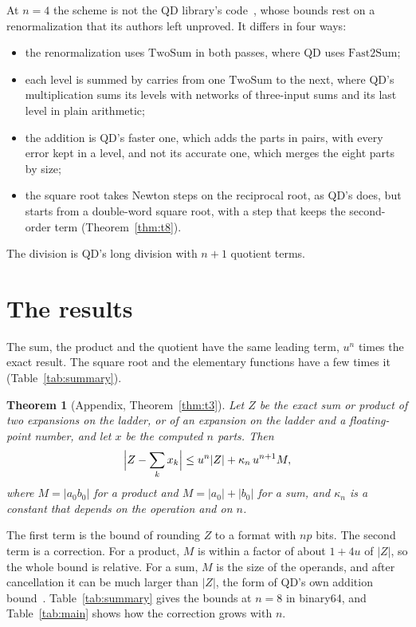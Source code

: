 \documentclass[conference]{IEEEtran}
\newtheorem{theorem}{Theorem}
\theoremstyle{definition}
\theoremstyle{remark}
\newcommand{\TwoSum}{\mathrm{TwoSum}}
\newcommand{\FastTwoSum}{\mathrm{Fast2Sum}}
\begin{document}
\begin{samepage}
At $n = 4$ the scheme is not the QD library's code~\cite{HLB01}, whose bounds rest on a renormalization that its
authors left unproved. It differs in four ways:
\begin{itemize}
\item the renormalization uses $\TwoSum$ in both passes, where QD uses $\FastTwoSum$;
\item each level is summed by carries from one $\TwoSum$ to the next, where QD's multiplication sums its levels
  with networks of three-input sums and its last level in plain arithmetic;
\item the addition is QD's faster one, which adds the parts in pairs, with every error kept in a level, and not its
  accurate one, which merges the eight parts by size;
\item the square root takes Newton steps on the reciprocal root, as QD's does, but starts from a double-word square
  root, with a step that keeps the second-order term (Theorem~\ref{thm:t8}).
\end{itemize}
\end{samepage}
The division is QD's long division with $n + 1$ quotient terms.

\section{The results}

The sum, the product and the quotient have the same leading term, $u^n$ times the exact result. The square root and
the elementary functions have a few times it (Table~\ref{tab:summary}).

\begin{theorem}[Appendix, Theorem~\ref{thm:t3}]\label{thm:main}
Let $Z$ be the exact sum or product of two expansions on the ladder, or of an expansion on the ladder and a
floating-point number, and let $x$ be the computed $n$ parts. Then
\[
\Bigl|Z - \sum_k x_k\Bigr| \le u^n|Z| + \kappa_n\,u^{n+1}M,
\]
where $M = |a_0b_0|$ for a product and $M = |a_0| + |b_0|$ for a sum, and $\kappa_n$ is a constant that depends on
the operation and on $n$.
\end{theorem}

The first term is the bound of rounding $Z$ to a format with $np$ bits. The second term is a correction. For a product,
$M$ is within a factor of about $1 + 4u$ of $|Z|$, so the whole bound is relative. For a sum, $M$ is the size of the operands,
and after cancellation it can be much larger than $|Z|$, the form of QD's own addition bound~\cite{HLB01}. Table~\ref{tab:summary}
gives the bounds at $n = 8$ in binary64, and Table~\ref{tab:main} shows how the correction grows with $n$.
\end{document}
